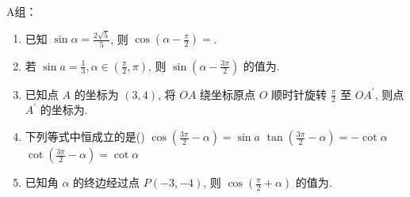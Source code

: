 A组：
\begin{enumerate}
\item 已知 $\sin \alpha=\frac{2 \sqrt{5}}{5}$, 则 $\cos \left(\alpha-\frac{\pi}{2}\right)=$.

\item 若 $\sin a=\frac{1}{3}, \alpha\in\left(\frac{\pi}{2}, \pi\right)$, 则 $\sin \left(\alpha-\frac{3 \pi}{2}\right)$ 的值为.

\item 已知点 $A$ 的坐标为 $(3,4)$, 将 $O A$ 绕坐标原点 $O$ 顺时针旋转 $\frac{\pi}{2}$ 至 $O A^{\prime}$, 则点 $A^{\prime}$ 的坐标为.
\item 下列等式中恒成立的是\dotfill()
{$\cos \left(\frac{3 \pi}{2}-\alpha\right)=\sin a$}
{$\tan \left(\frac{3 \pi}{2}-\alpha\right)=-\cot \alpha$}
{$\cot \left(\frac{3 \pi}{2}-\alpha\right)=\cot \alpha$}


\item 已知角 $\alpha$ 的终边经过点 $P(-3,-4)$, 则 $\cos \left(\frac{\pi}{2}+\alpha\right)$ 的值为.


\end{enumerate}


